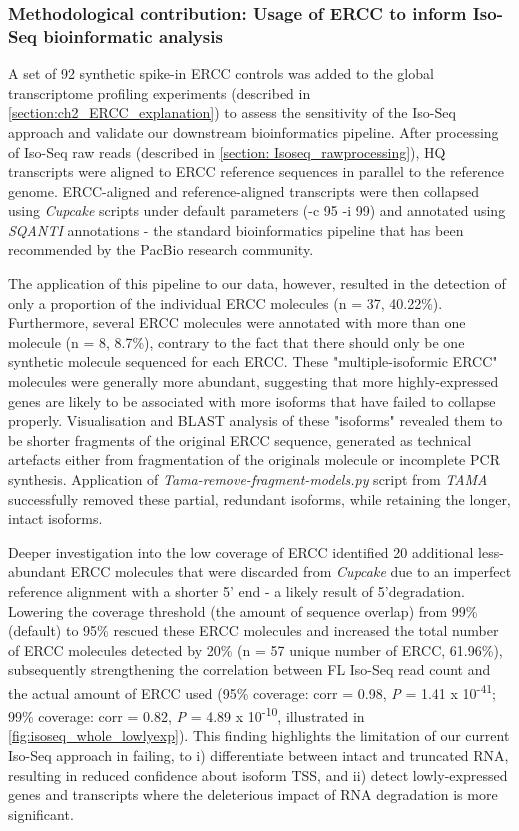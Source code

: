 \newpage
\subsubsection{Methodological contribution: Usage of ERCC to inform Iso-Seq bioinformatic analysis}
\label{ercc_development}
A set of 92 synthetic spike-in ERCC controls was added to the global transcriptome profiling experiments (described in \cref{section:ch2_ERCC_explanation}) to assess the sensitivity of the Iso-Seq approach and validate our downstream bioinformatics pipeline. After processing of Iso-Seq raw reads (described in \cref{section: Isoseq_rawprocessing}), HQ transcripts were aligned to ERCC reference sequences in parallel to the reference genome. ERCC-aligned and reference-aligned transcripts were then collapsed using \textit{Cupcake} scripts under default parameters (-c 95 -i 99) and annotated using \textit{SQANTI} annotations - the standard bioinformatics pipeline that has been recommended by the PacBio research community. 

The application of this pipeline to our data, however, resulted in the detection of only a proportion of the individual ERCC molecules (n = 37, 40.22\%). Furthermore, several ERCC molecules were annotated with more than one molecule (n = 8, 8.7\%), contrary to the fact that there should only be one synthetic molecule sequenced for each ERCC. These "multiple-isoformic ERCC" molecules were generally more abundant, suggesting that more highly-expressed genes are likely to be associated with more isoforms that have failed to collapse properly. Visualisation and BLAST analysis of these "isoforms" revealed them to be shorter fragments of the original ERCC sequence, generated as technical artefacts either from fragmentation of the originals molecule or incomplete PCR synthesis. Application of \textit{Tama-remove-fragment-models.py} script from \textit{TAMA}\cite{Kuo2017} successfully removed these partial, redundant isoforms, while retaining the longer, intact isoforms. 

Deeper investigation into the low coverage of ERCC identified  20 additional less-abundant ERCC molecules that were discarded from \textit{Cupcake} due to an imperfect reference alignment with a shorter 5' end - a likely result of 5'degradation. Lowering the coverage threshold (the amount of sequence overlap) from 99\% (default) to 95\% rescued these ERCC molecules and increased the total number of ERCC molecules detected by 20\% (n = 57 unique number of ERCC, 61.96\%), subsequently strengthening the correlation between FL Iso-Seq read count and the actual amount of ERCC used (95\% coverage: corr = 0.98, \textit{P} = 1.41 x 10\textsuperscript{-41}; 99\% coverage: corr = 0.82, \textit{P} = 4.89 x 10\textsuperscript{-10}, illustrated in \cref{fig:isoseq_whole_lowlyexp}). This finding highlights the limitation of our current Iso-Seq approach in failing, to i) differentiate between intact and truncated RNA, resulting in reduced confidence about isoform TSS, and ii) detect lowly-expressed genes and transcripts where the deleterious impact of RNA degradation is more significant. 